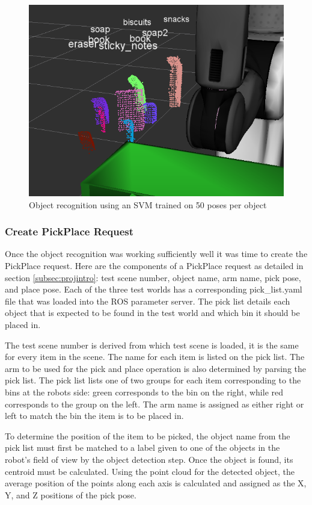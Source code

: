 \documentclass{article}
\begin{document}
\begin{figure}[H]
    \includegraphics[width=\linewidth]{pr2objrec.png}
    \caption{Object recognition using an SVM trained on 50 poses per object}
    \label{fig:pr2objrec}
\end{figure}

\subsubsection{Create PickPlace Request}
Once the object recognition was working sufficiently well it was time to create the PickPlace request. Here are the components of a PickPlace request as detailed in section \ref{subsec:projintro}: test scene number, object name, arm name, pick pose, and place pose. Each of the three test worlds has a corresponding pick\_list.yaml file that was loaded into the ROS parameter server. The pick list details each object that is expected to be found in the test world and which bin it should be placed in.

The test scene number is derived from which test scene is loaded, it is the same for every item in the scene. The name for each item is listed on the pick list. The arm to be used for the pick and place operation is also determined by parsing the pick list. The pick list lists one of two groups for each item corresponding to the bins at the robots side: green corresponds to the bin on the right, while red corresponds to the group on the left. The arm name is assigned as either right or left to match the bin the item is to be placed in.

To determine the position of the item to be picked, the object name from the pick list must first be matched to a label given to one of the objects in the robot's field of view by the object detection step. Once the object is found, its centroid must be calculated. Using the point cloud for the detected object, the average position of the points along each axis is calculated and assigned as the X, Y, and Z positions of the pick pose.
\end{document}
